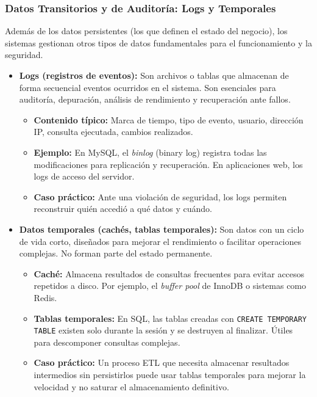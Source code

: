 \documentclass[12pt,a4paper,openany,oneside]{book}
\begin{document}
\subsubsection{Datos Transitorios y de Auditoría: Logs y Temporales}

Además de los datos persistentes (los que definen el estado del negocio), los sistemas gestionan otros tipos de datos fundamentales para el funcionamiento y la seguridad.

\begin{itemize}
    \item \textbf{Logs (registros de eventos):} Son archivos o tablas que almacenan de forma secuencial eventos ocurridos en el sistema. Son esenciales para auditoría, depuración, análisis de rendimiento y recuperación ante fallos.
        \begin{itemize}
            \item \textbf{Contenido típico:} Marca de tiempo, tipo de evento, usuario, dirección IP, consulta ejecutada, cambios realizados.
            \item \textbf{Ejemplo:} En MySQL, el \textit{binlog} (binary log) registra todas las modificaciones para replicación y recuperación. En aplicaciones web, los logs de acceso del servidor.
            \item \textbf{Caso práctico:} Ante una violación de seguridad, los logs permiten reconstruir quién accedió a qué datos y cuándo.
        \end{itemize}
    \item \textbf{Datos temporales (cachés, tablas temporales):} Son datos con un ciclo de vida corto, diseñados para mejorar el rendimiento o facilitar operaciones complejas. No forman parte del estado permanente.
        \begin{itemize}
            \item \textbf{Caché:} Almacena resultados de consultas frecuentes para evitar accesos repetidos a disco. Por ejemplo, el \textit{buffer pool} de InnoDB o sistemas como Redis.
            \item \textbf{Tablas temporales:} En SQL, las tablas creadas con \texttt{CREATE TEMPORARY TABLE} existen solo durante la sesión y se destruyen al finalizar. Útiles para descomponer consultas complejas.
            \item \textbf{Caso práctico:} Un proceso ETL que necesita almacenar resultados intermedios sin persistirlos puede usar tablas temporales para mejorar la velocidad y no saturar el almacenamiento definitivo.
        \end{itemize}
\end{itemize}
\end{document}
